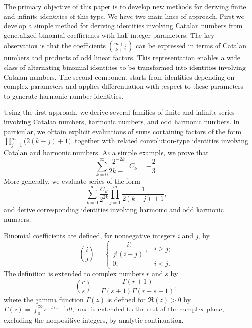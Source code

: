 \documentclass[12pt,reqno]{article}
\begin{document}
The primary objective of this paper is to develop new methods for deriving finite and infinite identities of this type. 
We have two main lines of approach. First we develop a simple method for deriving identities involving Catalan numbers from generalized binomial coefficients with half-integer parameters. The key observation is that the coefficients $\binom{m+\frac12}{k+1}$ can be expressed in terms of Catalan numbers and products of odd linear factors. This representation enables a wide class of alternating binomial identities 
to be transformed into identities involving Catalan numbers. The second component starts from identities depending on complex parameters and applies differentiation with respect to these parameters to generate harmonic-number identities.

Using the first approach, we derive several families of finite and infinite series involving Catalan numbers, harmonic numbers, 
and odd harmonic numbers. In particular, we obtain explicit evaluations of sums containing factors of the form
$\prod\limits_{j=1}^{m}\big({2(k-j)+1}\big)$, together with related convolution-type identities involving Catalan and harmonic numbers. 
As a simple example, we prove that
\begin{equation*}
\sum_{k=0}^{\infty} \frac{2^{-2k}}{2k-1}\, C_k = -\frac23.
\end{equation*}
More generally, we evaluate series of the form
$$
\sum_{k=0}^{\infty} \frac{C_k}{2^{2k}} \prod_{j=1}^{m}\frac{1}{2(k-j)+1},
$$
and derive corresponding identities involving harmonic and odd harmonic numbers.

Binomial coefficients are defined, for nonnegative integers $i$ and $j$, by
\begin{equation*}
\binom ij=
\begin{cases}
\dfrac{{i!}}{{j!(i - j)!}}, & \text{$i \ge j$};\\
0, & \text{$i<j$}.
\end{cases}
\end{equation*}
The definition is extended to complex numbers $r$ and $s$ by
\begin{equation}\label{y89d722}
\binom rs= \frac{{\Gamma (r + 1)}}{{\Gamma (s + 1)\Gamma (r - s + 1)}},
\end{equation}
where the gamma function $\Gamma(z)$ is defined for $\Re(z)>0$ by
$
\Gamma (z) = \int_0^\infty  {e^{ - t} t^{z - 1}dt},
$
and is extended to the rest of the complex plane, excluding the nonpositive integers, by analytic continuation. 
\end{document}

